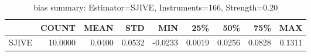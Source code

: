 \begin{table}[ht]
\centering
\caption{bias summary: Estimator=SJIVE, Instruments=166, Strength=0.20}
\begin{tabular}{lrrrrrrrr}
\toprule
 & COUNT & MEAN & STD & MIN & 25\% & 50\% & 75\% & MAX \\
\midrule
SJIVE & 10.0000 & 0.0400 & 0.0532 & -0.0233 & 0.0019 & 0.0256 & 0.0828 & 0.1311 \\
\bottomrule
\end{tabular}
\end{table}
